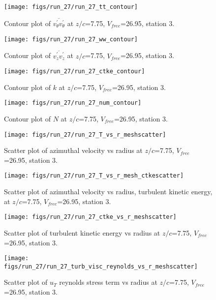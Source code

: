 \begin{figure}[H]
\centering
\texttt{[image: figs/run\_27/run\_27\_tt\_contour]}
\caption{Contour plot of $\overline{v_{\theta}^{\prime} v_{\theta}^{\prime}}$ at $z/c$=7.75, $V_{free}$=26.95, station 3.}
\end{figure}


\begin{figure}[H]
\centering
\texttt{[image: figs/run\_27/run\_27\_ww\_contour]}
\caption{Contour plot of $\overline{v_{z}^{\prime} v_{z}^{\prime}}$ at $z/c$=7.75, $V_{free}$=26.95, station 3.}
\end{figure}


\begin{figure}[H]
\centering
\texttt{[image: figs/run\_27/run\_27\_ctke\_contour]}
\caption{Contour plot of $k$ at $z/c$=7.75, $V_{free}$=26.95, station 3.}
\end{figure}


\begin{figure}[H]
\centering
\texttt{[image: figs/run\_27/run\_27\_num\_contour]}
\caption{Contour plot of $N$ at $z/c$=7.75, $V_{free}$=26.95, station 3.}
\end{figure}


\begin{figure}[H]
\centering
\texttt{[image: figs/run\_27/run\_27\_T\_vs\_r\_meshscatter]}
\caption{Scatter plot of azimuthal velocity vs radius at $z/c$=7.75, $V_{free}$=26.95, station 3.}
\end{figure}


\begin{figure}[H]
\centering
\texttt{[image: figs/run\_27/run\_27\_T\_vs\_r\_mesh\_ctkescatter]}
\caption{Scatter plot of azimuthal velocity vs radius, turbulent kinetic energy, at $z/c$=7.75, $V_{free}$=26.95, station 3.}
\end{figure}


\begin{figure}[H]
\centering
\texttt{[image: figs/run\_27/run\_27\_ctke\_vs\_r\_meshscatter]}
\caption{Scatter plot of turbulent kinetic energy vs radius at $z/c$=7.75, $V_{free}$=26.95, station 3.}
\end{figure}


\begin{figure}[H]
\centering
\texttt{[image: figs/run\_27/run\_27\_turb\_visc\_reynolds\_vs\_r\_meshscatter]}
\caption{Scatter plot of $
u_T$ reynolds stress term vs radius at $z/c$=7.75, $V_{free}$=26.95, station 3.}
\end{figure}


